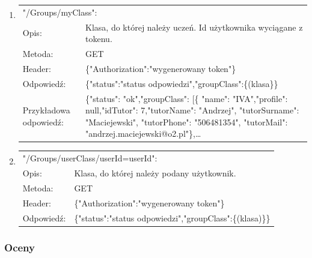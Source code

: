 \documentclass[12pt, titlepage]{article}
\begin{document}
\begin{enumerate}
	\item 
	{\renewcommand{\arraystretch}{1.5}
	\begin{tabular}[t]{p{3cm} p{15cm}}
	\multicolumn{2}{l}{"/Groups/myClass":} \\
	Opis: &  Klasa, do której należy uczeń. \newline Id użytkownika wyciągane z tokenu.\\
	Metoda: & GET \\
	Header: & \{"Authorization":"wygenerowany token"\} \\
	Odpowiedź: & \{"status":"status odpowiedzi",\newline "groupClass":\{(klasa\}\} \\
	Przykładowa \newline odpowiedź: & \{"status": "ok",\newline "groupClass": [\newline \{ "name": "IVA",\newline "profile": null,\newline "idTutor": 7,\newline "tutorName": "Andrzej", \newline "tutorSurname": "Maciejewski", \newline
	"tutorPhone": "506481354",\newline
        "tutorMail": "andrzej.maciejewski@o2.pl"\},\newline \ldots
	\end{tabular}}
	
	\item 
	{\renewcommand{\arraystretch}{1.5}
	\begin{tabular}[t]{p{3cm} p{15cm}}
	\multicolumn{2}{l}{"/Groups/userClass/userId={userId}":} \\
	Opis: &  Klasa, do której należy podany użytkownik. \\
	Metoda: & GET \\
	Header: & \{"Authorization":"wygenerowany token"\} \\
	Odpowiedź: & \{"status":"status odpowiedzi",\newline "groupClass":\{(klasa)\}\}
	\end{tabular}}
\end{enumerate}

\subsubsection{Oceny}
\end{document}
